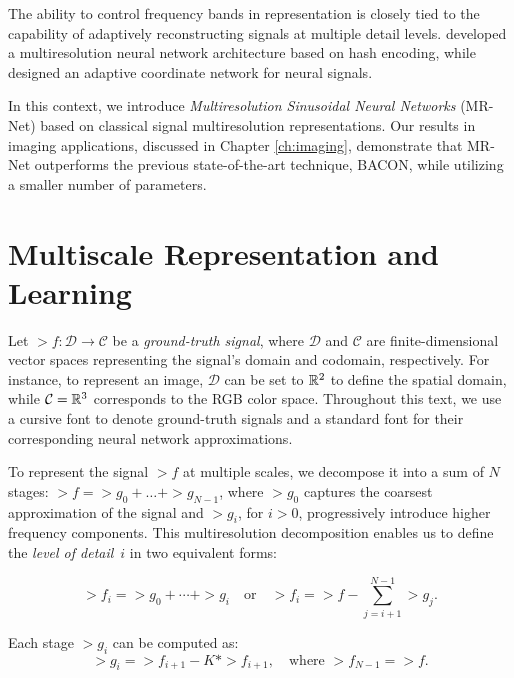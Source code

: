 The ability to control frequency bands in representation is closely tied to the capability of adaptively reconstructing signals at multiple detail levels. \citet{mueller2022instant} developed a multiresolution neural network architecture based on hash encoding, while \citet{martel2021acorn} designed an adaptive coordinate network for neural signals.

In this context, we introduce \textit{Multiresolution Sinusoidal Neural Networks} (MR-Net) \cite{paz2022,paz2023mr} based on classical signal multiresolution representations. Our results in imaging applications, discussed in Chapter \ref{ch:imaging}, demonstrate that MR-Net outperforms the previous state-of-the-art technique, BACON, while utilizing a smaller number of parameters.

\section{Multiscale Representation and Learning}
\label{s-motivation}


Let $\gt{f}:\mathcal{D}\to \mathcal{C}$ be a \textit{ground-truth signal}, where $\mathcal{D}$ and $\mathcal{C}$ are finite-dimensional vector spaces representing the signal's domain and codomain, respectively. For instance, to represent an image, $\mathcal{D}$ can be set to $\mathbb{R}^2$ to define the spatial domain, while $\mathcal{C}=\mathbb{R}^3$ corresponds to the RGB color space. Throughout this text, we use a cursive font to denote ground-truth signals and a standard font for their corresponding neural network approximations.

To represent the signal $\gt{f}$ at multiple scales, we decompose it into a sum of $N$ stages: $\gt{f}=\gt{g}_0+\dots+\gt{g}_{N-1}$, where $\gt{g}_0$ captures the coarsest approximation of the signal and $\gt{g}_i$, for $i>0$, progressively introduce higher frequency components. This multiresolution decomposition enables us to define the \textit{level of detail}~$i$ in two equivalent forms:

\begin{equation}
\gt{f}_i = \gt{g}_0 + \cdots + \gt{g}_i \quad \text{or} \quad \gt{f}_i = \gt{f} - \sum_{j=i+1}^{N-1} \gt{g}_j.
\end{equation}

Each stage $\gt{g}_i$ can be computed as:
\begin{equation}
\gt{g}_i = \gt{f}_{i+1} - K * \gt{f}_{i+1}, \quad \text{where } \gt{f}_{N-1} = \gt{f}.
\end{equation}

